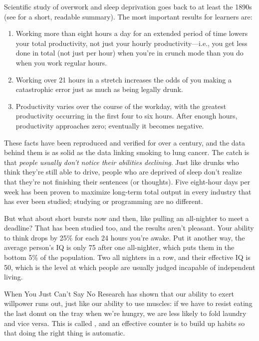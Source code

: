 Scientific study of overwork and sleep deprivation goes back to at least
the 1890s (see \cite{Robi2005} for a short, readable summary). The
most important results for learners are:

\begin{enumerate}
\item
  Working more than eight hours a day for an extended period of time
  lowers your total productivity, not just your hourly
  productivity---i.e., you get less done in total (not just per hour)
  when you're in crunch mode than you do when you work regular hours.
\item
  Working over 21 hours in a stretch increases the odds of you making
  a catastrophic error just as much as being legally drunk.
\item
  Productivity varies over the course of the workday, with the
  greatest productivity occurring in the first four to six hours.
  After enough hours, productivity approaches zero; eventually it
  becomes negative.
\end{enumerate}

These facts have been reproduced and verified for over a century, and
the data behind them is as solid as the data linking smoking to lung
cancer. The catch is that \emph{people usually don't notice their abilities
declining}. Just like drunks who think they're still able to drive,
people who are deprived of sleep don't realize that they're not
finishing their sentences (or thoughts). Five eight-hour days per week
has been proven to maximize long-term total output in every industry
that has ever been studied; studying or programming are no different.

But what about short bursts now and then, like pulling an all-nighter to
meet a deadline? That has been studied too, and the results aren't
pleasant. Your ability to think drops by 25\% for each 24 hours you're
awake. Put it another way, the average person's IQ is only 75 after one
all-nighter, which puts them in the bottom 5\% of the population. Two all
nighters in a row, and their effective IQ is 50, which is the level at
which people are usually judged incapable of independent living.

\begin{aside}{When You Just Can't Say No}
  Research has shown that our ability to exert willpower runs out,
  just like our ability to use muscles: if we have to resist eating
  the last donut on the tray when we're hungry, we are less likely to
  fold laundry and vice versa. This is called  \cite{Mill2016a}, and an effective
  counter is to build up habits so that doing the right thing is
  automatic.
\end{aside}

